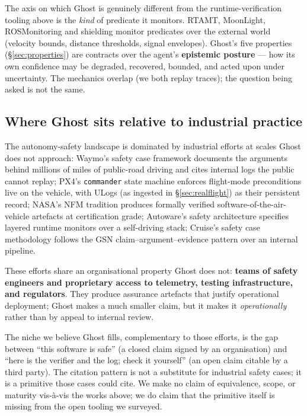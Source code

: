 \documentclass[11pt,a4paper]{article}
\begin{document}
The axis on which Ghost is genuinely different from the
runtime-verification tooling above is the \emph{kind} of
predicate it monitors. RTAMT, MoonLight, ROSMonitoring and
shielding monitor predicates over the external world (velocity
bounds, distance thresholds, signal envelopes). Ghost's five
properties (\S\ref{sec:properties}) are contracts over the
agent's \textbf{epistemic posture} --- how its own confidence may
be degraded, recovered, bounded, and acted upon under
uncertainty. The mechanics overlap (we both replay traces); the
question being asked is not the same.

\subsection{Where Ghost sits relative to industrial practice}
\label{sec:industrial}

The autonomy-safety landscape is dominated by industrial efforts at
scales Ghost does not approach: Waymo's safety case framework
documents the arguments behind millions of miles of public-road
driving and cites internal logs the public cannot replay; PX4's
\texttt{commander} state machine enforces
flight-mode preconditions live on the vehicle, with ULogs (as
ingested in \S\ref{sec:realflight}) as their persistent record;
NASA's NFM tradition produces formally verified
software-of-the-air-vehicle artefacts at certification grade;
Autoware's safety architecture specifies layered runtime monitors
over a self-driving stack; Cruise's safety case methodology follows
the GSN claim--argument--evidence pattern over an internal pipeline.

These efforts share an organisational property Ghost does not:
\textbf{teams of safety engineers and proprietary access to telemetry,
testing infrastructure, and regulators}. They produce assurance
artefacts that justify operational deployment; Ghost makes a much
smaller claim, but it makes it \emph{operationally} rather than by
appeal to internal review.

The niche we believe Ghost fills, complementary to those efforts, is
the gap between ``this software is safe'' (a closed claim signed by
an organisation) and ``here is the verifier and the log; check it
yourself'' (an open claim citable by a third party). The citation
pattern is not a substitute for industrial safety cases; it is a
primitive those cases could cite. We make no claim of equivalence,
scope, or maturity vis-à-vis the works above; we do claim that the
primitive itself is missing from the open tooling we surveyed.
\end{document}
